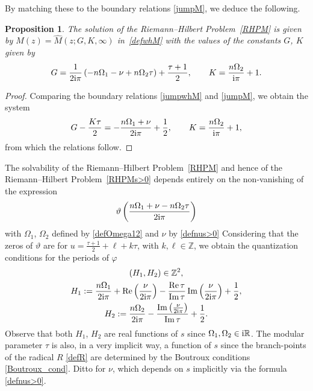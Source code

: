 \documentclass[10pt,a4paper]{amsart}
\numberwithin{equation}{section}
\newtheorem{Proposition}[Theorem]{Proposition}
\theoremstyle{definition}
\def \ds{\displaystyle}
\def\le{\left}
\def\ri{\right}
\def \wh{\widehat}
\def\nn{\nonumber}
\def\be{\begin{equation}}
\def\ee{\end{equation}}
\def\Z{{\mathbb Z}}
\def\R{{\mathbb R}}
\def \Re{\operatorname{Re} }
\def \Im {\operatorname{Im} }
\begin{document}
By matching these to the boundary relations \eqref{jumpM}, we deduce the following.

\begin{Proposition}\label{propM}
The solution of the Riemann--Hilbert Problem~{\rm\ref{RHPM}} is given by $M(z) = \wh M(z;G,K,\infty)$ in~\eqref{defwhM} with the values of the constants $G$, $K$ given by
\be
\label{defGs>0}
G= \frac {1}{2{\rm i}\pi} \le(-n\Omega_1 - \nu + n \Omega_2\tau\ri) + \frac {\tau+1}2,\qquad
K = \frac {n\Omega_2}{{\rm i}\pi} + 1.
\ee
\end{Proposition}

\begin{proof}
Comparing the boundary relations \eqref{jumpwhM} and \eqref{jumpM}, we obtain the system
\[
\ds G - \frac {K \tau}2 = - \frac{n\Omega_1+\nu}{2{\rm i}\pi} + \frac 1 2,
\qquad
\ds K = \frac{n\Omega_2}{{\rm i}\pi} +1,
\]
from which the relations follow.
\end{proof}

The solvability of the Riemann--Hilbert Problem~\ref{RHPM} and hence of the Riemann--Hilbert Problem~\ref{RHPMs>0} depends entirely on the non-vanishing of the expression
\be
\vartheta\le(\frac {n\Omega_1 + \nu - n \Omega_2\tau }{2{\rm i}\pi} \ri)
\label{674}
\ee
with $\Omega_1$, $\Omega_2$ defined by \eqref{defOmega12} and $\nu$ by \eqref{defnus>0}
Considering that the zeros of $\vartheta$ are for $u=\frac {\tau +1}2 + \ell + k\tau$, with $k,\ell\in \Z$, we obtain the quantization conditions for the periods of $\varphi$
\begin{gather}
(H_1,H_2)\in \Z^2 \nn,\\
H_1:= \frac{n\Omega_1}{2{\rm i}\pi} + \Re\le(\frac {\nu} {2{\rm i}\pi} \ri) - \frac {\Re \tau}{\Im\tau} \Im\le(\frac {\nu}{2{\rm i}\pi}\ri) + \frac 1 2,\nn
\\
H_2:= \frac{n\Omega_2}{2{\rm i}\pi} - \frac {\Im\le(\frac{\nu}{2{\rm i}\pi}\ri)}{\Im \tau} + \frac 1 2.\label{quantcond}
\end{gather}
Observe that both $H_1$, $H_2$ are real functions of $s$ since $\Omega_1,\Omega_2\in {\rm i}\R$. The modular parameter $\tau$ is also, in a very implicit way, a function of $s$ since the branch-points of the radical $R$ \eqref{defR} are determined by the Boutroux conditions \eqref{Boutroux_cond}. Ditto for $\nu$, which depends on $s$ implicitly via the formula \eqref{defnus>0}.
\end{document}
